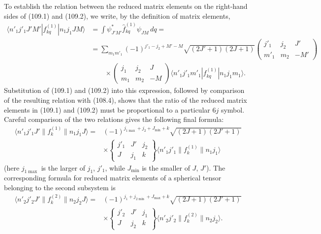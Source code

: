 To establish the relation between the reduced matrix elements on the right-hand sides of (109.1) and (109.2), we write, by the definition of matrix elements,
\[
 \begin{aligned}
 \langle n'_1j'_1J'M'|f_{kq}^{(1)}|n_1j_1JM\rangle
 & =\int\psi_{J'M'}^{*}\widehat f_{kq}^{(1)}\psi_{JM}\,dq={}\\
 & =\sum_{m_1m'_1}(-1)^{j'_1-j_2+M'-M}
 \sqrt{(2J'+1)(2J+1)}
 \begin{pmatrix}j'_1&j_2&J'\\m'_1&m_2&-M'\end{pmatrix}\\
 &\qquad\times
 \begin{pmatrix}j_1&j_2&J\\m_1&m_2&-M\end{pmatrix}
 \langle n'_1j'_1m'_1|f_{kq}^{(1)}|n_1j_1m_1\rangle.
 \end{aligned}
\]
Substitution of (109.1) and (109.2) into this expression, followed by comparison of the resulting relation with (108.4), shows that the ratio of the reduced matrix elements in (109.1) and (109.2) must be proportional to a particular $6j$ symbol. Careful comparison of the two relations gives the following final formula:
\begin{equation}
 \begin{aligned}
 \langle n'_1j'_1J'\|f_k^{(1)}\|n_1j_1J\rangle
 ={}&(-1)^{j_{1\max}+j_2+J_{\min}+k}
 \sqrt{(2J+1)(2J'+1)}\\
 &\times
 \begin{Bmatrix}j'_1&J'&j_2\\J&j_1&k\end{Bmatrix}
 \langle n'_1j'_1\|f_k^{(1)}\|n_1j_1\rangle
 \end{aligned}
 \tag{109.3}
\end{equation}
(here $j_{1\max}$ is the larger of $j_1$, $j'_1$, while $J_{\min}$ is the smaller of $J$, $J'$). The corresponding formula for reduced matrix elements of a spherical tensor belonging to the second subsystem is
\begin{equation}
 \begin{aligned}
 \langle n'_2j'_2J'\|f_k^{(2)}\|n_2j_2J\rangle
 ={}&(-1)^{j_1+j_{2\min}+J_{\max}+k}
 \sqrt{(2J+1)(2J'+1)}\\
 &\times
 \begin{Bmatrix}j'_2&J'&j_1\\J&j_2&k\end{Bmatrix}
 \langle n'_2j'_2\|f_k^{(2)}\|n_2j_2\rangle.
 \end{aligned}
 \tag{109.4}
\end{equation}

